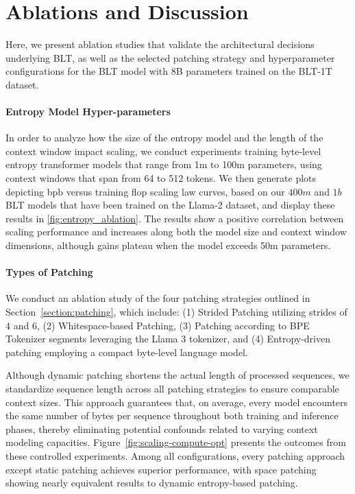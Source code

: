 \section{Ablations and Discussion}
\label{section:ablations}
Here, we present ablation studies that validate the architectural decisions underlying {\textsc BLT}, as well as the selected patching strategy and hyperparameter configurations for the {\textsc BLT} model with 8B parameters trained on the {\textsc BLT}-1T dataset.

\paragraph{Entropy Model Hyper-parameters} In order to analyze how the size of the entropy model and the length of the context window impact scaling, we conduct experiments training byte-level entropy transformer models that range from 1m to 100m parameters, using context windows that span from 64 to 512 tokens. We then generate plots depicting bpb versus training flop scaling law curves, based on our $400m$ and $1b$ {\textsc BLT} models that have been trained on the Llama-2 dataset, and display these results in \autoref{fig:entropy_ablation}. The results show a positive correlation between scaling performance and increases along both the model size and context window dimensions, although gains plateau when the model exceeds 50m parameters.

\paragraph{Types of Patching}

We conduct an ablation study of the four patching strategies outlined in Section~\ref{section:patching}, which include: (1) Strided Patching utilizing strides of 4 and 6, (2) Whitespace-based Patching, (3) Patching according to BPE Tokenizer segments leveraging the Llama 3 tokenizer, and (4) Entropy-driven patching employing a compact byte-level language model.

Although dynamic patching shortens the actual length of processed sequences, we standardize sequence length across all patching strategies to ensure comparable context sizes. This approach guarantees that, on average, every model encounters the same number of bytes per sequence throughout both training and inference phases, thereby eliminating potential confounds related to varying context modeling capacities. Figure~\ref{fig:scaling-compute-opt} presents the outcomes from these controlled experiments. Among all configurations, every patching approach except static patching achieves superior performance, with space patching showing nearly equivalent results to dynamic entropy-based patching.

